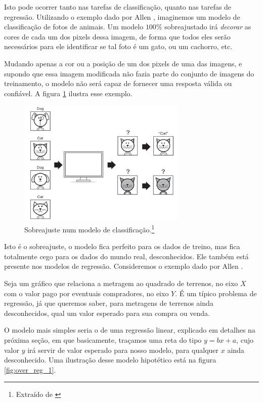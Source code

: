 Isto pode ocorrer tanto nas tarefas de classificação, quanto nas tarefas de regressão. Utilizando o exemplo dado por Allen \citep{allen}, imaginemos um modelo de classificação de fotos de animais. Um modelo $100\%$ sobreajustado irá \emph{decorar} as cores de cada um dos pixels dessa imagem, de forma que todos eles serão necessários para ele identificar se tal foto é um gato, ou um cachorro, etc.

Mudando apenas a cor ou a posição de um dos pixels de uma das imagens, e supondo que essa imagem modificada não fazia parte do conjunto de imagens do treinamento, o modelo não será capaz de fornecer uma resposta válida ou confiável. A figura \ref{fig:over_class} ilustra esse exemplo.

\begin{figure}[htb]
\centering
\includegraphics[width=8cm]{figuras/over_class}
\caption{Sobreajuste num modelo de classificação.\footnote{Extraído de \citep{allen}}}
\label{fig:over_class}
\end{figure}

Isto é o sobreajuste, o modelo fica perfeito para os dados de treino, mas fica totalmente cego para os dados do mundo real, desconhecidos. Ele também está presente nos modelos de regressão. Consideremos o exemplo dado por Allen \citep{allen}.

Seja um gráfico que relaciona a metragem ao quadrado de terrenos, no eixo $X$ com o valor pago por eventuais compradores, no eixo $Y$. É um típico problema de regressão, já que queremos saber, para metragens de terrenos ainda desconhecidos, qual um valor esperado para sua compra ou venda. 

O modelo mais simples seria o de uma regressão linear, explicado em detalhes na próxima seção, em que basicamente, traçamos uma reta do tipo $y = bx + a$, cujo valor $y$ irá servir de valor esperado para nosso modelo, para qualquer $x$ ainda desconhecido. Uma ilustração desse modelo hipotético está na figura \ref{fig:over_reg_1}.

